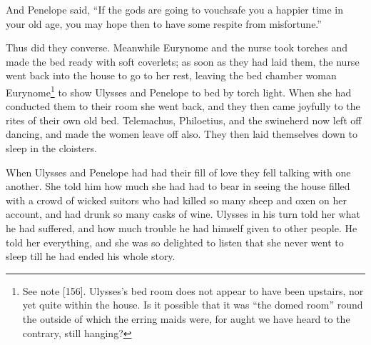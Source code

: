 And Penelope said, “If the gods are going to vouchsafe you a happier time in
your old age, you may hope then to have some respite from misfortune.”

Thus did they converse. Meanwhile Eurynome and the nurse took torches and made
the bed ready with soft coverlets; as soon as they had laid them, the nurse
went back into the house to go to her rest, leaving the bed chamber woman
Eurynome\footnote{See note [156]. Ulysses’s bed room does not appear to have been upstairs,
nor yet quite within the house. Is it possible that it was “the domed room”
round the outside of which the erring maids were, for aught we have heard to
the contrary, still hanging?} to
show Ulysses and Penelope to bed by torch light. When she had conducted them to
their room she went back, and they then came joyfully to the rites of their own
old bed. Telemachus, Philoetius, and the swineherd now left off dancing, and
made the women leave off also. They then laid themselves down to sleep in the
cloisters.

When Ulysses and Penelope had had their fill of love they fell talking with one
another. She told him how much she had had to bear in seeing the house filled
with a crowd of wicked suitors who had killed so many sheep and oxen on her
account, and had drunk so many casks of wine. Ulysses in his turn told her what
he had suffered, and how much trouble he had himself given to other people. He
told her everything, and she was so delighted to listen that she never went to
sleep till he had ended his whole story.

